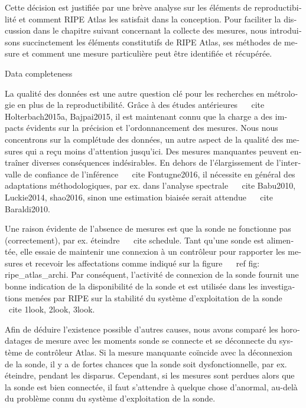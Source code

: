 \begin{otherlanguage}{french}
Cette décision est justifiée par une brève analyse sur les éléments de reproductibilité et comment RIPE Atlas les satisfait dans la conception.
Pour faciliter la discussion dans le chapitre suivant concernant la collecte des mesures, nous introduisons succinctement les éléments constitutifs de RIPE Atlas, ses méthodes de mesure et comment une mesure particulière peut être identifiée et récupérée.

Data completeness

La qualité des données est une autre question clé pour les recherches en métrologie en plus de la reproductibilité.
Grâce à des études antérieures ~ \ cite {Holterbach2015a, Bajpai2015}, il est maintenant connu que la charge a des impacts évidents sur la précision et l'ordonnancement des mesures.
Nous nous concentrons sur la complétude des données, un autre aspect de la qualité des mesures qui a reçu moins d'attention jusqu'ici. Des mesures manquantes peuvent entraîner diverses conséquences indésirables.
En dehors de l'élargissement de l'intervalle de confiance de l'inférence ~ \ cite {Fontugne2016}, il nécessite en général des adaptations méthodologiques, par ex. dans l'analyse spectrale ~ \ cite {Babu2010, Luckie2014, shao2016}, sinon une estimation biaisée serait attendue ~ \ cite {Baraldi2010}.

Une raison évidente de l'absence de mesures est que la sonde ne fonctionne pas (correctement), par ex. éteindre ~ \ cite {schedule}.
Tant qu'une sonde est alimentée, elle essaie de maintenir une connexion à un contrôleur pour rapporter les mesures et recevoir les affectations comme indiqué sur la figure ~ \ ref {fig: ripe_atlas_archi}.
Par conséquent, l'activité de connexion de la sonde fournit une bonne indication de la disponibilité de la sonde et est utilisée dans les investigations menées par RIPE sur la stabilité du système d'exploitation de la sonde ~ \ cite {1look, 2look, 3look}.

Afin de déduire l'existence possible d'autres causes, nous avons comparé les horodatages de mesure avec les moments sonde se connecte et se déconnecte du système de contrôleur Atlas.
Si la mesure manquante coïncide avec la déconnexion de la sonde, il y a de fortes chances que la sonde soit dysfonctionnelle, par ex. éteindre, pendant les disparus.
Cependant, si les mesures sont perdues alors que la sonde est bien connectée, il faut s'attendre à quelque chose d'anormal, au-delà du problème connu du système d'exploitation de la sonde.


\end{otherlanguage}
